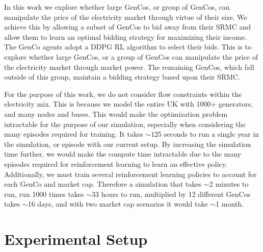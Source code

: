 In this work we explore whether large GenCos, or group of GenCos, can manipulate the price of the electricity market through virtue of their size. We achieve this by allowing a subset of GenCos to bid away from their SRMC and allow them to learn an optimal bidding strategy for maximizing their income. The GenCo agents adopt a DDPG RL algorithm to select their bids. This is to explore whether large GenCos, or a group of GenCos can manipulate the price of the electricity market through market power. The remaining GenCos, which fall outside of this group, maintain a bidding strategy based upon their SRMC.

For the purpose of this work, we do not consider flow constraints within the electricity mix. This is because we model the entire UK with 1000+ generators, and many nodes and buses. This would make the optimization problem intractable for the purpose of our simulation, especially when considering the many episodes required for training. It takes ${\sim}125$ seconds to run a single year in the simulation, or episode with our current setup. By increasing the simulation time further, we would make the compute time intractable due to the many episodes required for reinforcement learning to learn an effective policy. Additionally, we must train several reinforcement learning policies to account for each GenCo and market cap. Therefore a simulation that takes ${\sim}$2 minutes to run, run 1000 times takes ${\sim}$33 hours to run, multiplied by 12 different GenCos takes ${\sim}$16 days, and with two market cap scenarios it would take ${\sim}$1 month.









\section{Experimental Setup}
\label{rl:sec:methodology}


